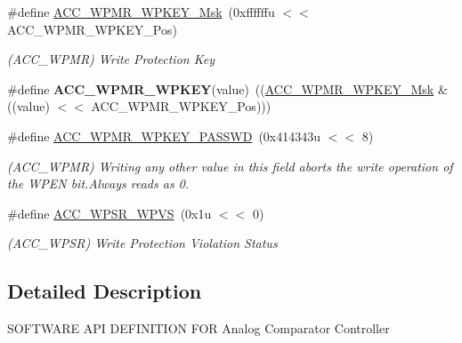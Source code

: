 \begin{DoxyCompactItemize}
\item 
\mbox{\label{group__SAMS70__ACC_ga9aa68668a3abab5758d5804e187ead84}} 
\#define \mbox{\hyperlink{group__SAMS70__ACC_ga9aa68668a3abab5758d5804e187ead84}{A\+C\+C\+\_\+\+W\+P\+M\+R\+\_\+\+W\+P\+K\+E\+Y\+\_\+\+Msk}}~(0xffffffu $<$$<$ A\+C\+C\+\_\+\+W\+P\+M\+R\+\_\+\+W\+P\+K\+E\+Y\+\_\+\+Pos)
\begin{DoxyCompactList}\small\item\em (A\+C\+C\+\_\+\+W\+P\+MR) Write Protection Key \end{DoxyCompactList}\item 
\mbox{\label{group__SAMS70__ACC_gac6c700f13c611085e645287fa076b5c4}} 
\#define {\bfseries A\+C\+C\+\_\+\+W\+P\+M\+R\+\_\+\+W\+P\+K\+EY}(value)~((\mbox{\hyperlink{group__SAMV71__ACC_ga9aa68668a3abab5758d5804e187ead84}{A\+C\+C\+\_\+\+W\+P\+M\+R\+\_\+\+W\+P\+K\+E\+Y\+\_\+\+Msk}} \& ((value) $<$$<$ A\+C\+C\+\_\+\+W\+P\+M\+R\+\_\+\+W\+P\+K\+E\+Y\+\_\+\+Pos)))
\item 
\mbox{\label{group__SAMS70__ACC_gaf8b3dd7f74ad28d3383ded796e90fb37}} 
\#define \mbox{\hyperlink{group__SAMS70__ACC_gaf8b3dd7f74ad28d3383ded796e90fb37}{A\+C\+C\+\_\+\+W\+P\+M\+R\+\_\+\+W\+P\+K\+E\+Y\+\_\+\+P\+A\+S\+S\+WD}}~(0x414343u $<$$<$ 8)
\begin{DoxyCompactList}\small\item\em (A\+C\+C\+\_\+\+W\+P\+MR) Writing any other value in this field aborts the write operation of the W\+P\+EN bit.\+Always reads as 0. \end{DoxyCompactList}\item 
\mbox{\label{group__SAMS70__ACC_gac5b5501d42101656c07ce85841fbef24}} 
\#define \mbox{\hyperlink{group__SAMS70__ACC_gac5b5501d42101656c07ce85841fbef24}{A\+C\+C\+\_\+\+W\+P\+S\+R\+\_\+\+W\+P\+VS}}~(0x1u $<$$<$ 0)
\begin{DoxyCompactList}\small\item\em (A\+C\+C\+\_\+\+W\+P\+SR) Write Protection Violation Status \end{DoxyCompactList}\end{DoxyCompactItemize}


\subsection{Detailed Description}
S\+O\+F\+T\+W\+A\+RE A\+PI D\+E\+F\+I\+N\+I\+T\+I\+ON F\+OR Analog Comparator Controller 